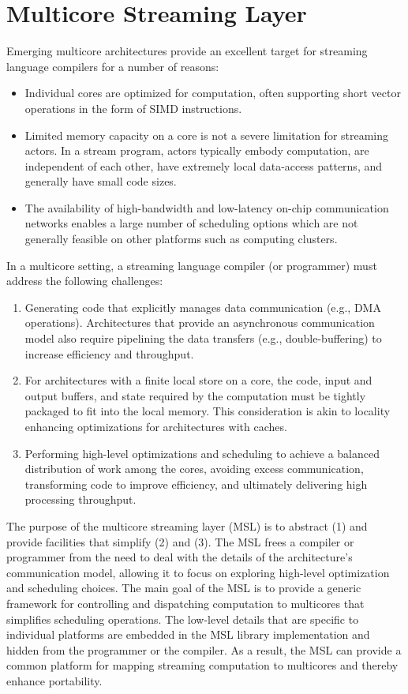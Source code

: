 \section{Multicore Streaming Layer}\label{ch:lib}

Emerging multicore architectures provide an excellent target for
streaming language compilers for a number of reasons:
\begin{itemize}
\item Individual cores are optimized for computation, often supporting
short vector operations in the form of SIMD instructions.
\item Limited memory capacity on a core is not a severe
limitation for streaming actors. In a stream program, actors typically
embody computation, are independent of each other, have extremely
local data-access patterns, and generally have small code sizes.
\item The availability of high-bandwidth and low-latency on-chip
communication networks enables a large number of scheduling options
which are not generally feasible on other platforms such as computing
clusters.
\end{itemize}

In a multicore setting, a streaming language compiler (or programmer)
must address the following challenges:
\begin{enumerate}
\item Generating code that explicitly manages data communication
  (e.g., DMA operations). Architectures that provide an asynchronous
  communication model also require pipelining the data transfers (e.g.,
  double-buffering) to increase efficiency and throughput.
\item For architectures with a finite local store on a core, the code,
  input and output buffers, and state required by the computation
  must be tightly packaged to fit into the local memory. This
  consideration is akin to locality enhancing optimizations for
  architectures with caches.
\item Performing high-level optimizations and scheduling to achieve a
  balanced distribution of work among the cores, avoiding excess
  communication, transforming code to improve efficiency, and
  ultimately delivering high processing throughput.
\end{enumerate}

The purpose of the multicore streaming layer (MSL) is to abstract
\textsf{(1)} and provide facilities that simplify \textsf{(2)} and
\textsf{(3)}. The MSL frees a compiler or programmer from the need to
deal with the details of the architecture's communication model,
allowing it to focus on exploring high-level optimization and
scheduling choices. The main goal of the MSL is to provide a generic
framework for controlling and dispatching computation to multicores
that simplifies scheduling operations. The low-level details that are
specific to individual platforms are embedded in the MSL library
implementation and hidden from the programmer or the compiler. As a
result, the MSL can provide a common platform for mapping streaming
computation to multicores and thereby enhance portability.
